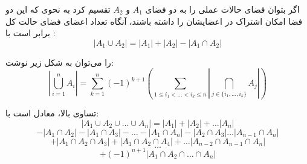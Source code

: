 
\begin{DEFINITION}
    \p
    اگر بتوان فضای حالات عملی را به دو فضای
    $A_1$
    و
    $A_2$
    تقسیم کرد به نحوی که این دو فضا امکان اشتراک در اعضایشان را داشته باشند،
    آنگاه تعداد اعضای فضای حالت کل برابر است با :
    $$|A_1 \cup	A_2| = |A_1| + |A_2| - |A_1 \cap A_2|$$
\end{DEFINITION}


\begin{THEOREM}
    \p
     را می‌توان به شکل زیر نوشت:
    $$|\bigcup\limits_{i=1}^n A_i| = \sum\limits_{k=1}^n (-1)^{k+1} (\sum\limits_{1 \leq i_1 < \dots < i_k \leq n} |\bigcap\limits_{j \in \{i_1,...,i_k\}} A_j|)$$
\end{THEOREM}
\p
تساوی بالا، معادل است با:
$$|A_1 \cup A_2 \cup \dots \cup A_n| = |A_1| + |A_2| + \dots |A_n|$$
$$- |A_1 \cap A_2| - |A_1 \cap A_3| - \dots - |A_1 \cap A_n| - |A_2 \cap A_3| \dots |A_{n-1} \cap A_n|$$
$$+ |A_1 \cap A_2 \cap A_3| + |A_1 \cap A_2 \cap A_4| + \dots |A_{n-2} \cap A_{n-1} \cap A_{n}|$$
$$\dots$$
$$+ (-1)^{n+1} |A_1 \cap A_2 \cap \dots \cap A_n|$$








